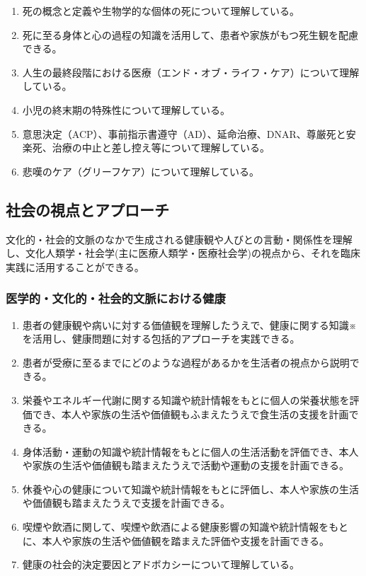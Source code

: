 \documentclass[
]{ltjsarticle}
\providecommand{\tightlist}{%
  \setlength{\itemsep}{0pt}\setlength{\parskip}{0pt}}
\begin{document}
\begin{enumerate}
\def\labelenumi{\arabic{enumi}.}
\tightlist
\item
  死の概念と定義や生物学的な個体の死について理解している。
\item
  死に至る身体と心の過程の知識を活用して、患者や家族がもつ死生観を配慮できる。
\item
  人生の最終段階における医療（エンド・オブ・ライフ・ケア）について理解している。
\item
  小児の終末期の特殊性について理解している。
\item
  意思決定（ACP）、事前指示書遵守（AD）、延命治療、DNAR、尊厳死と安楽死、治療の中止と差し控え等について理解している。
\item
  悲嘆のケア（グリーフケア）について理解している。
\end{enumerate}

\hypertarget{ux793eux4f1aux306eux8996ux70b9ux3068ux30a2ux30d7ux30edux30fcux30c1}{%
\subsection{社会の視点とアプローチ}\label{ux793eux4f1aux306eux8996ux70b9ux3068ux30a2ux30d7ux30edux30fcux30c1}}

文化的・社会的文脈のなかで生成される健康観や人びとの言動・関係性を理解し、文化人類学・社会学(主に医療人類学・医療社会学)の視点から、それを臨床実践に活用することができる。

\hypertarget{ux533bux5b66ux7684ux6587ux5316ux7684ux793eux4f1aux7684ux6587ux8108ux306bux304aux3051ux308bux5065ux5eb7}{%
\subsubsection{医学的・文化的・社会的文脈における健康}\label{ux533bux5b66ux7684ux6587ux5316ux7684ux793eux4f1aux7684ux6587ux8108ux306bux304aux3051ux308bux5065ux5eb7}}

\begin{enumerate}
\def\labelenumi{\arabic{enumi}.}
\tightlist
\item
  患者の健康観や病いに対する価値観を理解したうえで、健康に関する知識※を活用し、健康問題に対する包括的アプローチを実践できる。
\item
  患者が受療に至るまでにどのような過程があるかを生活者の視点から説明できる。
\item
  栄養やエネルギー代謝に関する知識や統計情報をもとに個人の栄養状態を評価でき、本人や家族の生活や価値観もふまえたうえで食生活の支援を計画できる。
\item
  身体活動・運動の知識や統計情報をもとに個人の生活活動を評価でき、本人や家族の生活や価値観も踏まえたうえで活動や運動の支援を計画できる。
\item
  休養や心の健康について知識や統計情報をもとに評価し、本人や家族の生活や価値観も踏まえたうえで支援を計画できる。
\item
  喫煙や飲酒に関して、喫煙や飲酒による健康影響の知識や統計情報をもとに、本人や家族の生活や価値観を踏まえた評価や支援を計画できる。
\item
  健康の社会的決定要因とアドボカシーについて理解している。
\end{enumerate}
\end{document}
